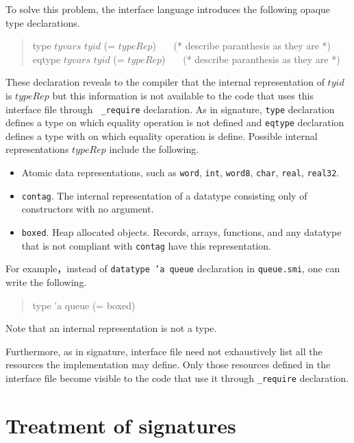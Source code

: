 \documentclass{jbook}
\newcommand{\txt}[2]{#2}
\newenvironment{program}{\begin{quote}\begin{tt}}%
                        {\end{tt}\end{quote}}
\begin{document}
	To solve this problem, the interface language introduces the
following opaque type declarations.
\begin{program}
type $tyvars$ $tyid$ (= $typeRep$) \ \ \ 
(* describe paranthesis as they are *)\\
eqtype $tyvars$ $tyid$ (= $typeRep$) \ \ \
(* describe paranthesis as they are *)
\end{program}
	These declaration reveals to the compiler that the internal
representation of $tyid$ is $typeRep$ but this information is not
available to the code that uses this interface file through {\tt
\_require} declaration.
	As in signature, {\tt type} declaration defines a type on which 
equality operation is not defined and {\tt eqtype} declaration defines a
type with on which  equality operation is define.
 	Possible internal representations $typeRep$ include the
following.
\begin{itemize}
\item Atomic data representations, such as
{\tt word}, {\tt int}, {\tt word8}, {\tt char}, {\tt real}, {\tt real32}.
\item {\tt contag}.
	The internal representation of a datatype consisting only of
constructors with no argument.
\item {\tt boxed}.
	Heap allocated objects.
	Records, arrays, functions, and any datatype that is not compliant
with {\tt contag} have this representation.
\end{itemize}
	For example，instead of {\tt datatype 'a queue} declaration in
{\tt queue.smi}, one can write the following.
\begin{program}
type 'a queue (= boxed)
\end{program}
	Note that an internal representation is not a type.

	Furthermore, as in signature, interface file need not
exhaustively list all the resources the implementation may define.
	Only those resources defined in the interface file become
visible to the code that use it through {\tt \_require} declaration.
\fi%

\section{\txt{シグネチャの扱い}{Treatment of signatures}}
\label{sec:tutorialSignatureInInterface}
\end{document}
